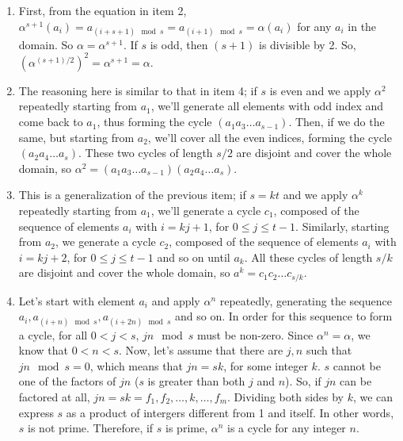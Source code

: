 \documentclass{article}
\begin{document}
\begin{enumerate}
    \item First, from the equation in item 2, $\alpha^{s + 1}(a_i) = a_{(i + s + 1) \mod s} = a_{(i + 1) \mod s} = \alpha(a_i)$ for any $a_i$ in the domain. So $\alpha = \alpha^{s + 1}$. If $s$ is odd, then $(s + 1)$ is divisible by 2. So, $(\alpha^{(s + 1)/2})^2 = \alpha^{s + 1} = \alpha$.
    
    \item The reasoning here is similar to that in item 4; if $s$ is even and we apply $\alpha^2$ repeatedly starting from $a_1$, we'll generate all elements with odd index and come back to $a_1$, thus forming the cycle $(a_1a_3\ldots a_{s-1})$. Then, if we do the same, but starting from $a_2$, we'll cover all the even indices, forming the cycle $(a_2a_4\ldots a_s)$. These two cycles of length $s/2$ are disjoint and cover the whole domain, so $\alpha^2 = (a_1a_3\ldots a_{s-1})(a_2a_4\ldots a_s)$.

    \item This is a generalization of the previous item; if $s = kt$ and we apply $\alpha^k$ repeatedly starting from $a_1$, we'll generate a cycle $c_1$, composed of the sequence of elements $a_i$ with $i = kj + 1$, for $0 \leqslant j \leqslant t - 1$. Similarly, starting from $a_2$, we generate a cycle $c_2$, composed of the sequence of elements $a_i$ with $i = kj + 2$, for $0 \leqslant j \leqslant t - 1$ and so on until $a_k$. All these cycles of length $s/k$ are disjoint and cover the whole domain, so $a^k = c_1c_2\ldots c_{s/k}$.

    \item Let's start with element $a_i$ and apply $\alpha^n$ repeatedly, generating the sequence $a_i, a_{(i + n)\mod s}, a_{(i + 2n)\mod s}$ and so on. In order for this sequence to form a cycle, for all $0 < j < s$, $jn \mod s$ must be non-zero. Since $\alpha^n = \alpha$, we know that $0 < n < s$. Now, let's assume that there are $j, n$ such that $jn \mod s = 0$, which means that $jn = sk$, for some integer $k$. $s$ cannot be one of the factors of $jn$ ($s$ is greater than both $j$ and $n$). So, if $jn$ can be factored at all, $jn = sk = f_1, f_2, \ldots, k, \ldots, f_m$. Dividing both sides by $k$, we can express $s$ as a product of intergers different from 1 and itself. In other words, $s$ is not prime. Therefore, if $s$ is prime, $\alpha^n$ is a cycle for any integer $n$.
\end{enumerate}
\end{document}
